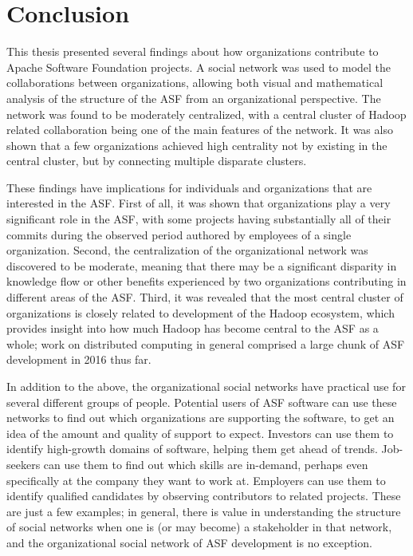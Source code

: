\chapter{Conclusion}
This thesis presented several findings about how organizations contribute to Apache Software Foundation projects. A social network was used to model the collaborations between organizations, allowing both visual and mathematical analysis of the structure of the ASF from an organizational perspective. The network was found to be moderately centralized, with a central cluster of Hadoop related collaboration being one of the main features of the network. It was also shown that a few organizations achieved high centrality not by existing in the central cluster, but by connecting multiple disparate clusters.



These findings have implications for individuals and organizations that are interested in the ASF. First of all, it was shown that organizations play a very significant role in the ASF, with some projects having substantially all of their commits during the observed period authored by employees of a single organization. Second, the centralization of the organizational network was discovered to be moderate, meaning that there may be a significant disparity in knowledge flow or other benefits experienced by two organizations contributing in different areas of the ASF. Third, it was revealed that the most central cluster of organizations is closely related to development of the Hadoop ecosystem, which provides insight into how much Hadoop has become central to the ASF as a whole; work on distributed computing in general comprised a large chunk of ASF development in 2016 thus far.

In addition to the above, the organizational social networks have practical use for several different groups of people. Potential users of ASF software can use these networks to find out which organizations are supporting the software, to get an idea of the amount and quality of support to expect. Investors can use them to identify high-growth domains of software, helping them get ahead of trends. Job-seekers can use them to find out which skills are in-demand, perhaps even specifically at the company they want to work at. Employers can use them to identify qualified candidates by observing contributors to related projects. These are just a few examples; in general, there is value in understanding the structure of social networks when one is (or may become) a stakeholder in that network, and the organizational social network of ASF development is no exception.

